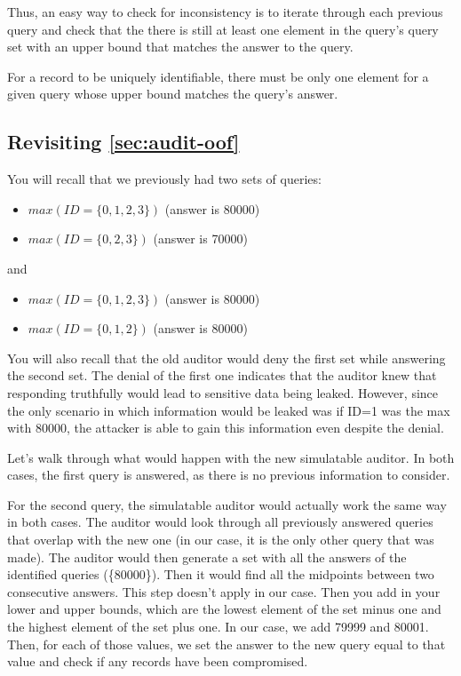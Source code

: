 \documentclass{article}
\begin{document}
Thus, an easy way to check for inconsistency is to iterate through each previous query and check that the there is still at least one element in the query's query set with an upper bound that matches the answer to the query.

For a record to be uniquely identifiable, there must be only one element for a given query whose upper bound matches the query's answer.

\subsection{Revisiting \ref{sec:audit-oof}}
You will recall that we previously had two sets of queries:

\begin{itemize}
    \item $max(ID=\{0, 1, 2, 3\})$ (answer is 80000)
    \item $max(ID=\{0, 2, 3\})$ (answer is 70000)
\end{itemize}
and
\begin{itemize}
    \item $max(ID=\{0, 1, 2, 3\})$ (answer is 80000)
    \item $max(ID=\{0, 1, 2\})$ (answer is 80000)
\end{itemize}

You will also recall that the old auditor would deny the first set while answering the second set.
The denial of the first one indicates that the auditor knew that responding truthfully would lead to sensitive data being leaked.
However, since the only scenario in which information would be leaked was if ID=1 was the max with 80000, the attacker is able to gain this information even despite the denial.

Let's walk through what would happen with the new simulatable auditor.
In both cases, the first query is answered, as there is no previous information to consider.

For the second query, the simulatable auditor would actually work the same way in both cases.
The auditor would look through all previously answered queries that overlap with the new one (in our case, it is the only other query that was made).
The auditor would then generate a set with all the answers of the identified queries (\{80000\}).
Then it would find all the midpoints between two consecutive answers.
This step doesn't apply in our case.
Then you add in your lower and upper bounds, which are the lowest element of the set minus one and the highest element of the set plus one.
In our case, we add 79999 and 80001.
Then, for each of those values, we set the answer to the new query equal to that value and check if any records have been compromised.
\end{document}
